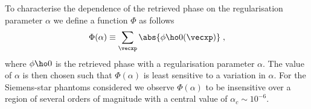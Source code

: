 \documentclass[
twoside,
openright,
titlepage,
numbers=noenddot,
headinclude,
fleqn,
a4paper,
footinclude=true,
cleardoublepage=empty,
abstractoff,
BCOR=5mm,
paper=a4,
fontsize=11pt,
british,ngerman,american,
]{scrreprt}
\begin{document}
To characterise the dependence of the retrieved phase on the
regularisation parameter $\alpha$ we define a function $\Phi$ as
follows
\begin{equation}
  \label{eq:phi-alpha}
  \Phi(\alpha) \equiv \sum_{\vecxp}\abs{\phi\ho0(\vecxp)} \;,
\end{equation}
where $\phi\ho0$ is the retrieved phase with a regularisation parameter
 $\alpha$.  The value of $\alpha$ is then chosen such that
$\Phi(\alpha)$ is least sensitive to a variation in $\alpha$.  For the
Siemens-star phantoms considered  we observe $\Phi(\alpha)$ to be
insensitive over a region of several orders of magnitude with a
central value of $\alpha_c\sim 10^{-6}$.

\begin{figure}
  \centering
  \tiny
\end{figure}
\end{document}
